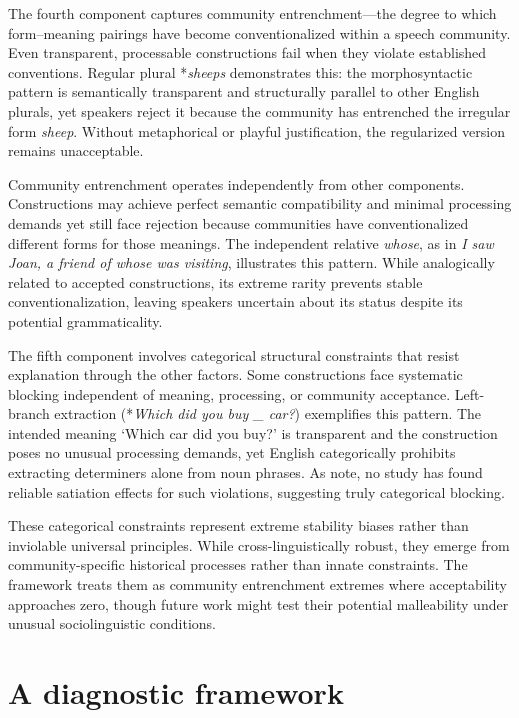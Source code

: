 \documentclass[12pt]{article}
\begin{document}
The fourth component captures community entrenchment—the degree to which form–meaning pairings have become conventionalized within a speech community. Even transparent, processable constructions fail when they violate established conventions. Regular plural *\textit{sheeps} demonstrates this: the morphosyntactic pattern is semantically transparent and structurally parallel to other English plurals, yet speakers reject it because the community has entrenched the irregular form \textit{sheep}. Without metaphorical or playful justification, the regularized version remains unacceptable.

Community entrenchment operates independently from other components. Constructions may achieve perfect semantic compatibility and minimal processing demands yet still face rejection because communities have conventionalized different forms for those meanings. The independent relative \textit{whose}, as in \textit{I saw Joan, a friend of whose was visiting}, illustrates this pattern. While analogically related to accepted constructions, its extreme rarity prevents stable conventionalization, leaving speakers uncertain about its status despite its potential grammaticality.

The fifth component involves categorical structural constraints that resist explanation through the other factors. Some constructions face systematic blocking independent of meaning, processing, or community acceptance. Left-branch extraction (*\textit{Which did you buy \_ car?}) exemplifies this pattern. The intended meaning `Which car did you buy?' is transparent and the construction poses no unusual processing demands, yet English categorically prohibits extracting determiners alone from noun phrases. As \textcite{Snyder2022} note, no study has found reliable satiation effects for such violations, suggesting truly categorical blocking.

These categorical constraints represent extreme stability biases rather than inviolable universal principles. While cross-linguistically robust, they emerge from community-specific historical processes rather than innate constraints. The framework treats them as community entrenchment extremes where acceptability approaches zero, though future work might test their potential malleability under unusual sociolinguistic conditions.

\section{A diagnostic framework}
\end{document}
